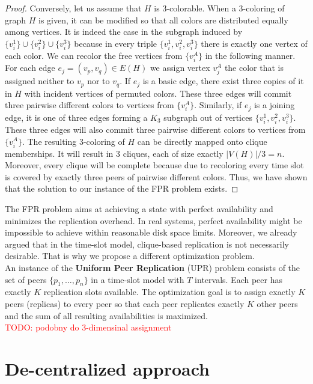 \documentclass{pracamgren}
\begin{document}
\begin{proof}
Conversely, let us assume that $H$ is 3-colorable. When a 3-coloring of graph $H$ is given, it can be modified so that all colors are distributed equally among vertices. It is indeed the case in the subgraph induced by $\{v^1_i\} \cup \{v^2_i\} \cup \{v^3_i\}$ because in every triple $\{v^1_i, v^2_i, v^3_i\}$ there is exactly one vertex of each color. We can recolor the free vertices from $\{v^A_i\}$ in the following manner. For each edge $e_j=(v_p,v_q)\in E(H)$ we assign vertex $v^A_j$ the color that is assigned neither to $v_p$ nor to $v_q$. If $e_j$ is a basic edge, there exist three copies of it in $H$ with incident vertices of permuted colors. These three edges will commit three pairwise different colors to vertices from $\{v^A_i\}$. Similarly, if $e_j$ is a joining edge, it is one of three edges forming a $K_3$ subgraph out of vertices $\{v^1_i, v^2_i, v^3_i\}$. These three edges will also commit three pairwise different colors to vertices from $\{v^A_i\}$.
The resulting 3-coloring of $H$ can be directly mapped onto clique memberships. It will result in 3 cliques, each of size exactly $|V(H)| / 3 = n$. Moreover, every clique will be complete because due to recoloring every time slot is covered by exactly three peers of pairwise different colors. Thus, we have shown that the solution to our instance of the FPR problem exists.
\end{proof}

The FPR problem aims at achieving a state with perfect availability and minimizes the replication overhead. In real systems, perfect availability might be impossible to achieve within reasonable disk space limits. Moreover, we already argued that in the time-slot model, clique-based replication is not necessarily desirable. That is why we propose a different optimization problem.\\

An instance of the {\bf Uniform Peer Replication} (UPR) problem consists of the set of peers $\{p_1,\ldots,p_n\}$ in a time-slot model with $T$ intervals. Each peer has exactly $K$ replication slots available. The optimization goal is to assign exactly $K$ peers (replicas) to every peer so that each peer replicates exactly $K$ other peers and the sum of all resulting availabilities is maximized.\\

\textcolor{red}{TODO: podobny do 3-dimensinal assignment}

\section{De-centralized approach}
\end{document}
